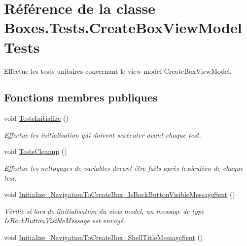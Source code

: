 \hypertarget{class_boxes_1_1_tests_1_1_create_box_view_model_tests}{}\section{Référence de la classe Boxes.\+Tests.\+Create\+Box\+View\+Model\+Tests}
\label{class_boxes_1_1_tests_1_1_create_box_view_model_tests}


Effectue les tests unitaires concernant le view model Create\+Box\+View\+Model.  


\subsection*{Fonctions membres publiques}
\begin{DoxyCompactItemize}
\item 
void \hyperlink{class_boxes_1_1_tests_1_1_create_box_view_model_tests_a1d813751528e634b253d780fcc794779}{Tests\+Initialize} ()
\begin{DoxyCompactList}\small\item\em Effectue les initialisation qui doivent s\textquotesingle{}exécuter avant chaque test. \end{DoxyCompactList}\item 
void \hyperlink{class_boxes_1_1_tests_1_1_create_box_view_model_tests_a2a692c8de3378e034057910464104f95}{Tests\+Cleanup} ()
\begin{DoxyCompactList}\small\item\em Effectue les nettoyages de variables devant être faits après l\textquotesingle{}exécution de chaque test. \end{DoxyCompactList}\item 
void \hyperlink{class_boxes_1_1_tests_1_1_create_box_view_model_tests_adeb87abdc4260dc20a35f481ae41a976}{Initialize\+\_\+\+Navigation\+To\+Create\+Box\+\_\+\+Is\+Back\+Button\+Visible\+Message\+Sent} ()
\begin{DoxyCompactList}\small\item\em Vérifie si lors de l\textquotesingle{}initialisation du view model, un message de type Is\+Back\+Button\+Visible\+Message est envoyé. \end{DoxyCompactList}\item 
void \hyperlink{class_boxes_1_1_tests_1_1_create_box_view_model_tests_a7211d7dda73fcadf8b1355b9448fab0d}{Initialize\+\_\+\+Navigation\+To\+Create\+Box\+\_\+\+Shell\+Title\+Message\+Sent} ()

\end{DoxyCompactItemize}
